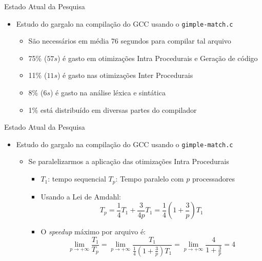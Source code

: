 \begin{frame}{Estado Atual da Pesquisa}
    \begin{itemize}
        \item Estudo do gargalo na compilação do GCC usando o \texttt{gimple-match.c}
            \begin{itemize}
                \item São necessários em média 76 segundos para compilar tal arquivo
                \item 75\% ($57s$) é gasto em otimizações Intra Procedurais e Geração de código
                \item 11\% ($11s$) é gasto nas otimizações Inter Procedurais
                \item 8\% ($6s$) é gasto na análise léxica e sintática
                \item 1\% está distribuído em diversas partes do compilador
            \end{itemize}
    \end{itemize}
\end{frame}

\begin{frame}{Estado Atual da Pesquisa}
    \begin{itemize}
        \item Estudo do gargalo na compilação do GCC usando o \texttt{gimple-match.c}
            \begin{itemize}
                \item Se paralelizarmos a aplicação das otimizações Intra Procedurais
            \begin{itemize}
                \item $T_1$: tempo sequencial \hfil\hfil $T_p$: Tempo paralelo com $p$ processadores
                \item Usando a Lei de Amdahl:
$$ T_p = \frac{1}{4} T_1 + \frac{3}{4p}T_1 = \frac{1}{4} \left( 1 + \frac{3}{p}
\right)T_1 $$ 
                \item O \textit{speedup} máximo por arquivo é: $$
\lim_{p \rightarrow +\infty} \frac{T_1}{T_p} = \lim_{p \rightarrow +\infty}
\frac{T_1}{\frac{1}{4} \left( 1 + \frac{3}{p} \right)T_1} = \lim_{p \rightarrow
+\infty} \frac{4}{1 + \frac{3}{p}} = 4$$
            \end{itemize}
            \end{itemize}
    \end{itemize}
\end{frame}


